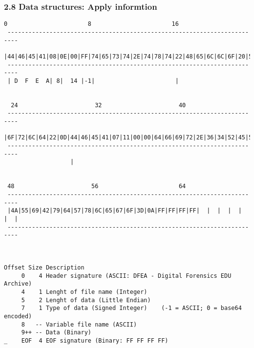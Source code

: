 \begin{frame}[fragile]
  \frametitle{2.8 Data structures: Apply informtion}
\begin{lstlisting}[basicstyle=\tiny]
  0                       8                       16                      
 ------------------------------------------------------------------------- 
 |44|46|45|41|08|0E|00|FF|74|65|73|74|2E|74|78|74|22|48|65|6C|6C|6F|20|57|
 -------------------------------------------------------------------------
 | D  F  E  A| 8|  14 |-1|                       |                      


  24                      32                      40
 -------------------------------------------------------------------------
 |6F|72|6C|64|22|0D|44|46|45|41|07|11|00|00|64|66|69|72|2E|36|34|52|45|5A|
 -------------------------------------------------------------------------
                   |


 48                      56                       64
 -------------------------------------------------------------------------
 |4A|55|69|42|79|64|57|78|6C|65|67|6F|3D|0A|FF|FF|FF|FF|  |  |  |  |  |  |
 -------------------------------------------------------------------------



Offset Size Description
     0    4 Header signature (ASCII: DFEA - Digital Forensics EDU Archive)
     4    1 Lenght of file name (Integer)
     5    2 Lenght of data (Little Endian)
     7    1 Type of data (Signed Integer)    (-1 = ASCII; 0 = base64 encoded)
     8   -- Variable file name (ASCII)
     9++ -- Data (Binary)
_    EOF  4 EOF signature (Binary: FF FF FF FF)
\end{lstlisting}
\end{frame}


